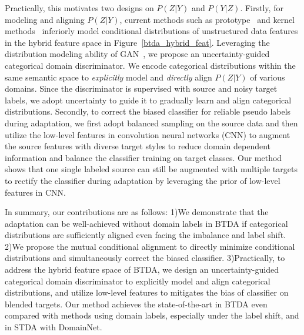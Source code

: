 \documentclass[letterpaper]{article} \usepackage{aaai23}  \usepackage{times}  \usepackage{helvet}  \usepackage{courier}  \usepackage[hyphens]{url}  \usepackage{graphicx} \urlstyle{rm} \def\UrlFont{\rm}  \usepackage{natbib}  \usepackage{caption} \frenchspacing  \setlength{\pdfpagewidth}{8.5in}  \setlength{\pdfpageheight}{11in}
\begin{document}
Practically, this motivates two designs on $P(Z|Y)$ and $P(Y|Z)$. Firstly, for modeling and aligning $P(Z|Y)$, current methods such as prototype~\cite{pan2019transferrable,tanwisuth2021prototype} and kernel methods~\cite{wang2020rethink} inferiorly model conditional distributions of unstructured data features in the hybrid feature space  in Figure~\ref{btda_hybrid_feat}. Leveraging the distribution modeling ability of GAN~\cite{arora2017generalization,goodfellow2014generative}, we propose an uncertainty-guided categorical domain discriminator. We encode categorical distributions within the same semantic space to \textit{explicitly} model and \textit{directly} align $P(Z|Y)$ of various domains. Since the discriminator is supervised with source and noisy target labels, we adopt uncertainty to guide it to gradually learn and align categorical distributions. Secondly, to correct the biased classifier for reliable pseudo labels during adaptation, we first adopt balanced sampling on the source data and then utilize the low-level features in convolution neural networks (CNN) to augment the source features with diverse target styles to
reduce domain dependent information and balance the classifier training on target classes. Our method shows that one single labeled source can still be augmented with multiple targets to rectify the classifier during adaptation by leveraging the prior of low-level features in CNN.


In summary, our contributions are as follows: 1)We demonstrate that the adaptation can be well-achieved without domain labels in BTDA if categorical distributions are sufficiently aligned even facing the imbalance and label shift.
2)We propose the mutual conditional alignment to directly minimize conditional distributions and simultaneously correct the biased classifier.
3)Practically, to address the hybrid feature space of BTDA, we design an uncertainty-guided categorical domain discriminator to explicitly model and align categorical distributions, and utilize low-level features to mitigates the bias of classifier on blended targets.
Our method achieves the state-of-the-art in BTDA even compared with methods using domain labels, especially under the label shift, and in STDA with DomainNet.
\end{document}

